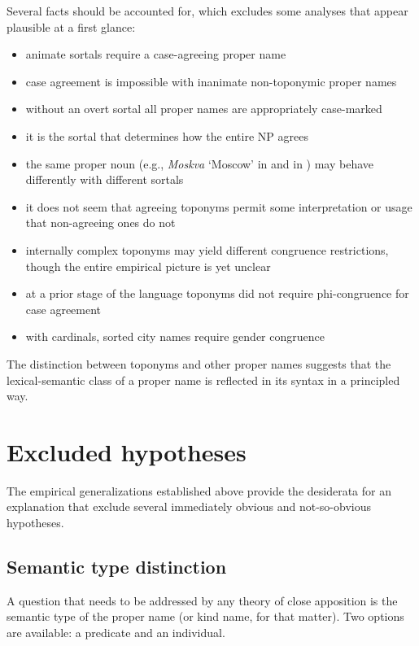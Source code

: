 \documentclass[output=paper,colorlinks,citecolor=brown]{langscibook}
\begin{document}
Several facts should be accounted for, which excludes some analyses that appear plausible at a first glance:

\begin{itemize}\sloppy
    \item animate sortals require a case-agreeing proper name
    \item case agreement is impossible with inanimate non-toponymic proper names
    \item without an overt sortal all proper names are appropriately case-marked
    \item it is the sortal that determines how the entire NP agrees
    \item the same proper noun (e.g., \textit{Moskva} ‘Moscow’ in  and in ) may behave differently with different sortals
    \item it does not seem that agreeing toponyms permit some interpretation or usage that non-agreeing ones do not
    \item internally complex toponyms may yield different congruence restrictions, though the entire empirical picture is yet unclear
    \item at a prior stage of the language toponyms did not require phi-congruence for case agreement
    \item with cardinals, sorted city names require gender congruence 
\end{itemize}

The distinction between toponyms and other proper names suggests that the lexical-semantic class of a proper name is reflected in its syntax in a principled way.

\section{Excluded hypotheses}\label{mat:sec:excluded-hypotheses}

The empirical generalizations established above provide the desiderata for an explanation that exclude several immediately obvious and not-so-obvious hypotheses.

\subsection{Semantic type distinction}\label{mat:sec:semantic-type-distinction}

A question that needs to be addressed by any theory of close apposition is the semantic type of the proper name (or kind name, for that matter). Two options are available: a predicate and an individual.
\end{document}
